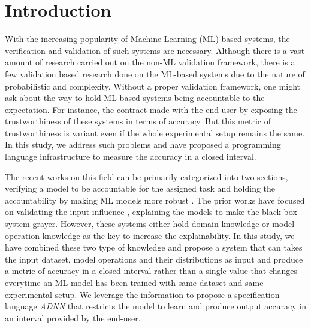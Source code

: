 
\section{Introduction}
With the increasing popularity of Machine Learning (ML) based systems, the verification and validation of such systems are necessary. Although there is a vast amount of research carried out on the non-ML validation framework, there is a few validation based research done on the ML-based systems due to the nature of probabilistic and complexity. Without a proper validation framework, one might ask about the way to hold ML-based systems being accountable to the expectation. For instance, the contract made with the end-user by exposing the trustworthiness of these systems in terms of accuracy. But this metric of trustworthiness is variant even if the whole experimental setup remains the same. In this study, we address such problems and have proposed a programming language infrastructure to measure the accuracy in a closed interval.

The recent works on this field can be primarily categorized into two sections, verifying a model to be accountable for the assigned task \cite{pulina2010abstraction,gehr2018ai2,du2018techniques,abdul2018trends,zhang2016understanding}  and holding the accountability by making ML models more robust \cite{wang2018formal,katz2017reluplex,jia2019taso}. The prior works have focused on validating the input influence \cite{datta2016algorithmic}, explaining the models to make the black-box system grayer. However, these systems either hold domain knowledge or model operation knowledge as the key to increase the explainability. In this study, we have combined these two type of knowledge and propose a system that can takes the input dataset, model operations and their distributions as input and produce a metric of accuracy in a closed interval rather than a single value that changes everytime an ML model has been trained with same dataset and same experimental setup. We leverage the information to propose a specification language \emph{ADNN} that restricts the model to learn and produce output accuracy in an interval provided by the end-user.
